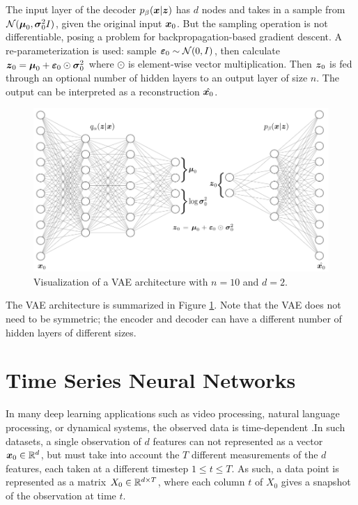 The input layer of the decoder $p_\beta(\boldsymbol{x} | \boldsymbol{z})$ has $d$ nodes and takes in a sample from $\mathcal{N}(\boldsymbol{\mu}_0, \boldsymbol{\sigma}_0^2I)$, given the original input $\boldsymbol{x}_0$. But the sampling operation is not differentiable, posing a problem for backpropagation-based gradient descent. A re-parameterization is used: sample $\boldsymbol{\varepsilon}_0 \sim \mathcal{N}(0,I)$, then calculate $\boldsymbol{z}_0 = \boldsymbol{\mu}_0 + \boldsymbol{\varepsilon}_0 \odot \boldsymbol{\sigma}_0^2$ where $\odot$ is element-wise vector multiplication. Then $\boldsymbol{z}_0$ is fed through an optional number of hidden layers to an output layer of size $n$. The output can be interpreted as a reconstruction $\hat{\boldsymbol{x}_0}$.

\begin{figure}[h]
  \centering
  \includegraphics[width=.95\textwidth]{img/vae_visual.png}
  \caption{Visualization of a VAE architecture with $n=10$ and $d=2$.}
  \label{fig:vae_visual}
\end{figure}
The VAE architecture is summarized in Figure \ref{fig:vae_visual}. Note that the VAE does not need to be symmetric; the encoder and decoder can have a different number of hidden layers of different sizes.

\section{Time Series Neural Networks}
In many deep learning applications such as video processing, natural language processing, or dynamical systems, the observed data is time-dependent \cite{kahou2015} \cite{vaswani2017} \cite{gilpin2020}.In such datasets, a single observation of $d$ features can not represented as a vector $\boldsymbol{x}_0 \in \mathbb{R}^d$, but must take into account the $T$ different measurements of the $d$ features, each taken at a different timestep $1 \leq t \leq T$. As such, a data point is represented as a matrix $X_0 \in \mathbb{R}^{d \times T}$, where each column $t$ of $X_0$ gives a snapshot of the observation at time $t$. 


